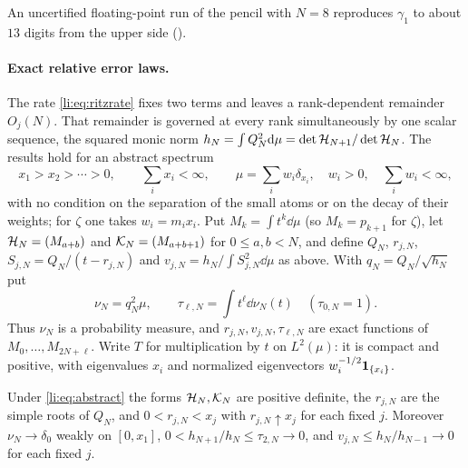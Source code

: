 An uncertified floating-point run of the pencil with $N=8$ reproduces $\gamma_1$ to about $13$
digits from the upper side ().

\paragraph{Exact relative error laws.}
The rate \eqref{li:eq:ritzrate} fixes two terms and leaves a rank-dependent remainder $O_j(N)$.
That remainder is governed at every rank simultaneously by one scalar sequence, the squared monic
norm $h_N=\int Q_N^2\mathrm{d}\mu=\det\mathcal{H}_{N+1}/\det\mathcal{H}_N$. The results hold for an abstract spectrum
\begin{equation}\label{li:eq:abstract}
 x_1>x_2>\cdots>0,\qquad\sum_ix_i<\infty,\qquad\mu=\sum_iw_i\delta_{x_i},\quad w_i>0,\quad
 \sum_iw_i<\infty,
\end{equation}
with no condition on the separation of the small atoms or on the decay of their weights; for $\zeta$
one takes $w_i=m_ix_i$. Put $M_k=\int t^k\dd\mu$ (so $M_k=p_{k+1}$ for $\zeta$), let $\mathcal{H}_N=(M_{a+b})$
and $\mathcal{K}_N=(M_{a+b+1})$ for $0\le a,b<N$, and define $Q_N$, $r_{j,N}$, $S_{j,N}=Q_N/(t-r_{j,N})$ and
$v_{j,N}=h_N/\int S_{j,N}^2\dd\mu$ as above. With $q_N=Q_N/\sqrt{h_N}$ put
\[
 \nu_N=q_N^2\mu,\qquad\tau_{\ell,N}=\int t^\ell\dd\nu_N(t)\quad(\tau_{0,N}=1).
\]
Thus $\nu_N$ is a probability measure, and $r_{j,N},v_{j,N},\tau_{\ell,N}$ are exact functions of
$M_0,\dots,M_{2N+\ell}$. Write $T$ for multiplication by $t$ on $L^2(\mu)$: it is compact and positive,
with eigenvalues $x_i$ and normalized eigenvectors $w_i^{-1/2}\mathbf{1}_{\{x_i\}}$.

\begin{lemma}\label{li:lem:ritzabs}
Under \eqref{li:eq:abstract} the forms $\mathcal{H}_N,\mathcal{K}_N$ are positive definite, the $r_{j,N}$ are the
simple roots of $Q_N$, and $0<r_{j,N}<x_j$ with $r_{j,N}\uparrow x_j$ for each fixed $j$. Moreover
$\nu_N\to\delta_0$ weakly on $[0,x_1]$, $0<h_{N+1}/h_N\le\tau_{2,N}\to0$, and
$v_{j,N}\le h_N/h_{N-1}\to0$ for each fixed $j$.
\end{lemma}

